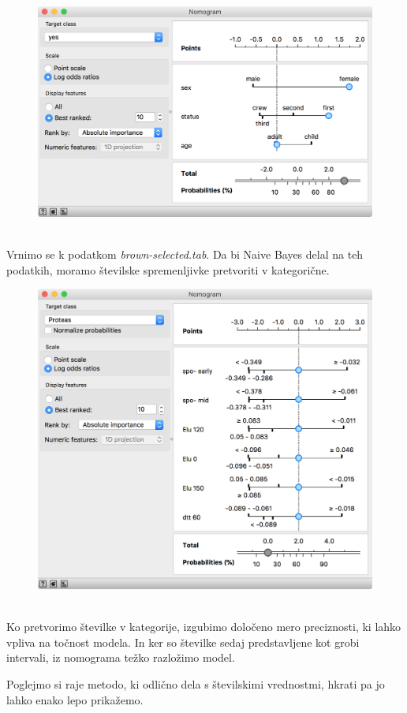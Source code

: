 \begin{figure}[h]
    \includegraphics[width=0.8\linewidth]{nomogram.png}
    \caption{$\;$}
\end{figure}

\newpage

Vrnimo se k podatkom \textit{brown-selected.tab}. Da bi Naive Bayes delal na teh podatkih, moramo številske spremenljivke pretvoriti v kategorične.

\begin{figure}[h]
    \centering
    \includegraphics[width=0.8\linewidth]{nomogram2.png}
    \caption{$\;$}
\end{figure}

Ko pretvorimo številke v kategorije, izgubimo določeno mero preciznosti, ki lahko vpliva na točnost modela. In ker so številke sedaj predstavljene kot grobi intervali, iz nomograma težko razložimo model.

Poglejmo si raje metodo, ki odlično dela s številskimi vrednostmi, hkrati pa jo lahko enako lepo prikažemo.